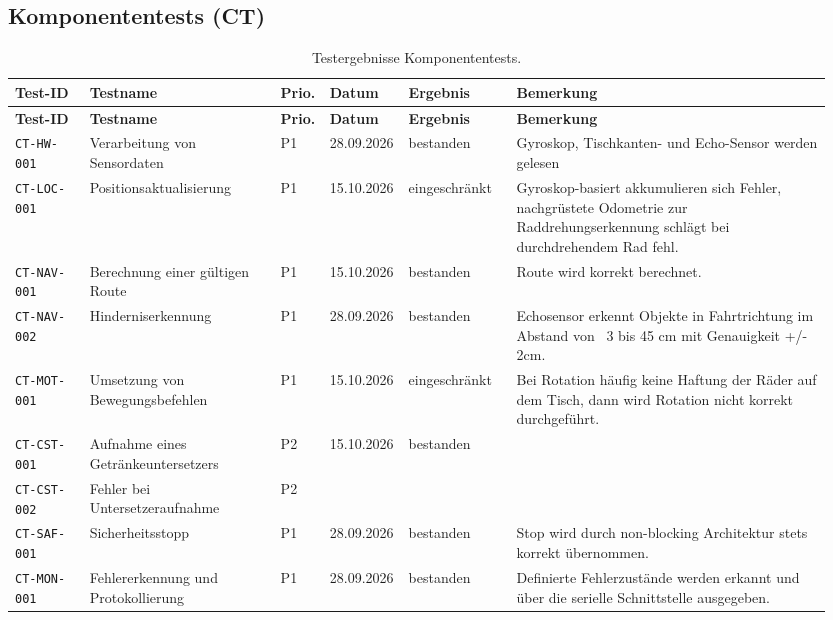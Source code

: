 \documentclass[
  a4paper,
  12pt,
  DIV=12,        %
  parskip=half,  %
  headings=small %
]{scrartcl}
\theoremstyle{definition}
\theoremstyle{definition}
\begin{document}
\begin{landscape}
\subsection{Komponententests (CT)}\label{ct-ergebnisse}
\begin{longtable}[]{@{}
  p{0.09\linewidth}p{0.23\linewidth}p{0.04\linewidth}p{0.08\linewidth}p{0.13\linewidth}p{0.38\linewidth}@{}}
\caption{Testergebnisse Komponententests.}\\
\toprule
\textbf{Test-ID} & \textbf{Testname} & \textbf{Prio.} & \textbf{Datum} & \textbf{Ergebnis} & \textbf{Bemerkung}\\
\midrule
\endfirsthead
\toprule
\textbf{Test-ID} & \textbf{Testname} & \textbf{Prio.} & \textbf{Datum} & \textbf{Ergebnis} & \textbf{Bemerkung}\\
\midrule
\endhead
\bottomrule
\endfoot
\texttt{CT-HW-001} & Verarbeitung von Sensordaten & P1 & 28.09.2026 & bestanden & Gyroskop, Tischkanten- und Echo-Sensor werden gelesen \\
\texttt{CT-LOC-001} & Positionsaktualisierung & P1 & 15.10.2026 & eingeschränkt & Gyroskop-basiert akkumulieren sich Fehler, nachgrüstete Odometrie zur Raddrehungserkennung schlägt bei durchdrehendem Rad fehl. \\
\texttt{CT-NAV-001} & Berechnung einer gültigen Route & P1 & 15.10.2026 & bestanden & Route wird korrekt berechnet.  \\
\texttt{CT-NAV-002} & Hinderniserkennung & P1 & 28.09.2026 & bestanden & Echosensor erkennt Objekte in Fahrtrichtung im Abstand von ~3 bis 45 cm mit Genauigkeit +/- 2cm. \\
\texttt{CT-MOT-001} & Umsetzung von Bewegungsbefehlen & P1 & 15.10.2026 & eingeschränkt & Bei Rotation häufig keine Haftung der Räder auf dem Tisch, dann wird Rotation nicht korrekt durchgeführt. \\
\texttt{CT-CST-001} & Aufnahme eines Getränkeuntersetzers & P2 & 15.10.2026 & bestanden & \\
\texttt{CT-CST-002} & Fehler bei Untersetzeraufnahme & P2 & & & \\
\texttt{CT-SAF-001} & Sicherheitsstopp & P1 & 28.09.2026& bestanden & Stop wird durch non-blocking Architektur stets korrekt übernommen. \\
\texttt{CT-MON-001} & Fehlererkennung und Protokollierung & P1 & 28.09.2026 & bestanden & Definierte Fehlerzustände werden erkannt und über die serielle Schnittstelle ausgegeben. \\
\end{longtable}
\end{landscape}
\end{document}

